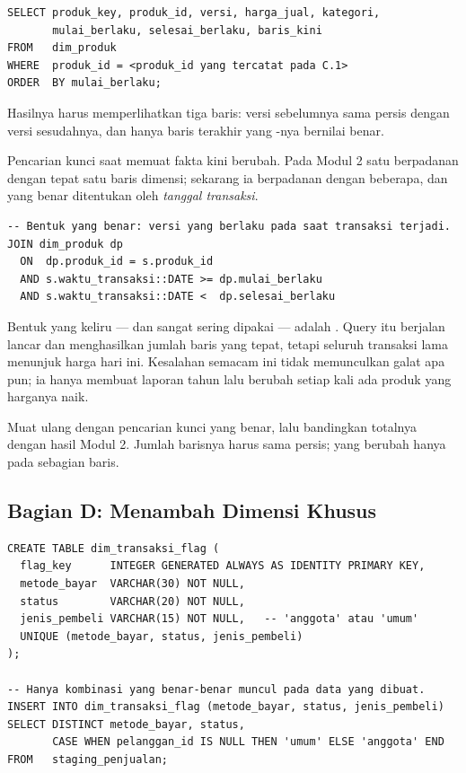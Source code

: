 \begin{lstlisting}[style=sqlgaya]
SELECT produk_key, produk_id, versi, harga_jual, kategori,
       mulai_berlaku, selesai_berlaku, baris_kini
FROM   dim_produk
WHERE  produk_id = <produk_id yang tercatat pada C.1>
ORDER  BY mulai_berlaku;
\end{lstlisting}

Hasilnya harus memperlihatkan tiga baris:  versi
sebelumnya sama persis dengan  versi sesudahnya, dan
hanya baris terakhir yang -nya bernilai benar.


Pencarian kunci saat memuat fakta kini berubah. Pada Modul 2 satu
 berpadanan dengan tepat satu baris dimensi; sekarang ia
berpadanan dengan beberapa, dan yang benar ditentukan oleh \emph{tanggal
transaksi}.

\begin{lstlisting}[style=sqlgaya]
-- Bentuk yang benar: versi yang berlaku pada saat transaksi terjadi.
JOIN dim_produk dp
  ON  dp.produk_id = s.produk_id
  AND s.waktu_transaksi::DATE >= dp.mulai_berlaku
  AND s.waktu_transaksi::DATE <  dp.selesai_berlaku
\end{lstlisting}

\begin{peringatan}
Bentuk yang keliru --- dan sangat sering dipakai --- adalah
. Query itu
berjalan lancar dan menghasilkan jumlah baris yang tepat, tetapi seluruh
transaksi lama menunjuk harga hari ini. Kesalahan semacam ini tidak
memunculkan galat apa pun; ia hanya membuat laporan tahun lalu berubah setiap
kali ada produk yang harganya naik.
\end{peringatan}

Muat ulang  dengan pencarian kunci yang benar, lalu
bandingkan totalnya dengan hasil Modul 2. Jumlah barisnya harus sama persis;
yang berubah hanya  pada sebagian baris.

\subsection{Bagian D: Menambah Dimensi Khusus}


\begin{lstlisting}[style=sqlgaya]
CREATE TABLE dim_transaksi_flag (
  flag_key      INTEGER GENERATED ALWAYS AS IDENTITY PRIMARY KEY,
  metode_bayar  VARCHAR(30) NOT NULL,
  status        VARCHAR(20) NOT NULL,
  jenis_pembeli VARCHAR(15) NOT NULL,   -- 'anggota' atau 'umum'
  UNIQUE (metode_bayar, status, jenis_pembeli)
);

-- Hanya kombinasi yang benar-benar muncul pada data yang dibuat.
INSERT INTO dim_transaksi_flag (metode_bayar, status, jenis_pembeli)
SELECT DISTINCT metode_bayar, status,
       CASE WHEN pelanggan_id IS NULL THEN 'umum' ELSE 'anggota' END
FROM   staging_penjualan;
\end{lstlisting}

